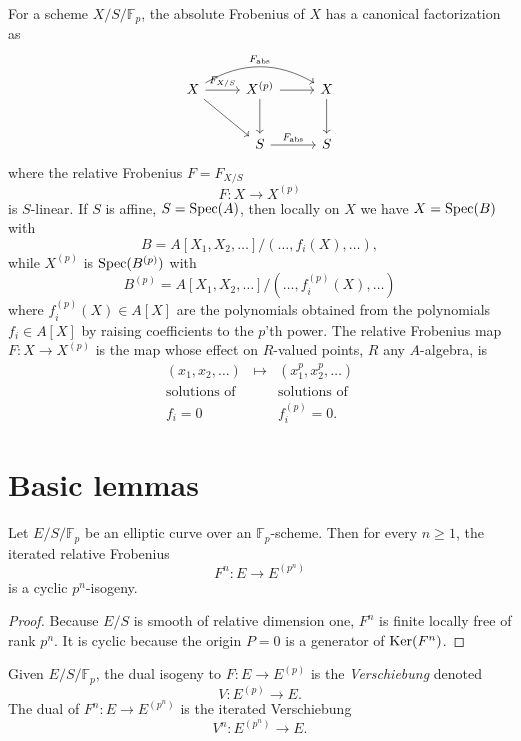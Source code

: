 For a scheme $X/S/\mathbb{F}_p$, the absolute Frobenius of $X$ has a canonical factorization as
\[
\begin{tikzcd}[row sep=2.5em, column sep=2.5em]
X \arrow[r, "F_{X/S}"] \arrow[dr] \arrow[rr, "F_{\mathrm{abs}}", bend left=30] & X^{(p)} \arrow[r] \arrow[d] & X \arrow[d] \\
& S \arrow[r, "F_{\mathrm{abs}}"] & S
\end{tikzcd}
\]
where the relative Frobenius $F = F_{X/S}$
\[
F : X \to X^{(p)}
\]
is $S$-linear. If $S$ is affine, $S = \operatorname{Spec}(A)$, then locally on $X$ we have $X = \operatorname{Spec}(B)$ with
\[
B = A[X_1, X_2, \dots]/(\dots, f_i(X), \dots) ,
\]
while $X^{(p)}$ is $\operatorname{Spec}(B^{(p)})$ with
\[
B^{(p)} = A[X_1, X_2, \dots]/(\dots, f_i^{(p)}(X), \dots)
\]
where $f_i^{(p)}(X) \in A[X]$ are the polynomials obtained from the polynomials $f_i \in A[X]$ by raising coefficients to the $p$'th power. The relative Frobenius map $F : X \to X^{(p)}$ is the map whose effect on $R$-valued points, $R$ any $A$-algebra, is
\[
\begin{matrix}
(x_1, x_2, \dots) & \longmapsto & (x_1^p, x_2^p, \dots) \\[3pt]
\text{solutions of} & & \text{solutions of} \\[2pt]
f_i = 0 & & f_i^{(p)} = 0 .
\end{matrix}
\]

\section{Basic lemmas}
\label{sec:12.2}

\begin{klem}\label{lem:12.2.1}
Let $E/S/\mathbb{F}_p$ be an elliptic curve over an $\mathbb{F}_p$-scheme. Then for every $n \ge 1$, the iterated relative Frobenius
\[
F^n : E \to E^{(p^n)}
\]
is a cyclic $p^n$-isogeny.
\end{klem}

\begin{proof}
Because $E/S$ is smooth of relative dimension one, $F^n$ is finite locally free of rank $p^n$. It is cyclic because the origin $P = 0$ is a generator of $\operatorname{Ker}(F^n)$.
\end{proof}

\kmitem\label{item:12.2.2}
Given $E/S/\mathbb{F}_p$, the dual isogeny to $F : E \to E^{(p)}$ is the \emph{Verschiebung} denoted
\[
V : E^{(p)} \to E .
\]
The dual of $F^n : E \to E^{(p^n)}$ is the iterated Verschiebung
\[
V^n : E^{(p^n)} \to E .
\]

